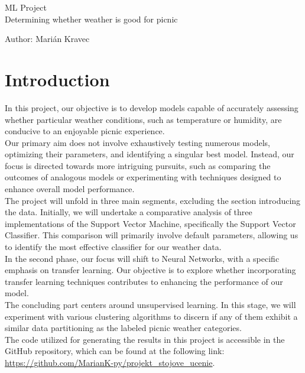 \documentclass[a4paper]{article}
\begin{document}
 
	
	\pagestyle{plain}
	
	\begin{center}
		\sc\large
		ML Project
		\\
		Determining whether weather is good for picnic 
	\end{center}
	
	Author: Marián Kravec
	
	\section{Introduction}
	
	In this project, our objective is to develop models capable of accurately assessing whether particular weather conditions, such as temperature or humidity, are conducive to an enjoyable picnic experience.
	\\
	
	Our primary aim does not involve exhaustively testing numerous models, optimizing their parameters, and identifying a singular best model. Instead, our focus is directed towards more intriguing pursuits, such as comparing the outcomes of analogous models or experimenting with techniques designed to enhance overall model performance.
	\\
	
	The project will unfold in three main segments, excluding the section introducing the data. Initially, we will undertake a comparative analysis of three implementations of the Support Vector Machine, specifically the Support Vector Classifier. This comparison will primarily involve default parameters, allowing us to identify the most effective classifier for our weather data.
	\\
	
	In the second phase, our focus will shift to Neural Networks, with a specific emphasis on transfer learning. Our objective is to explore whether incorporating transfer learning techniques contributes to enhancing the performance of our model.
	\\
	
	The concluding part centers around unsupervised learning. In this stage, we will experiment with various clustering algorithms to discern if any of them exhibit a similar data partitioning as the labeled picnic weather categories.
	\\
	
	The code utilized for generating the results in this project is accessible in the GitHub repository, which can be found at the following link: \url{https://github.com/MarianK-py/projekt_stojove_ucenie}.
	
\end{document}
